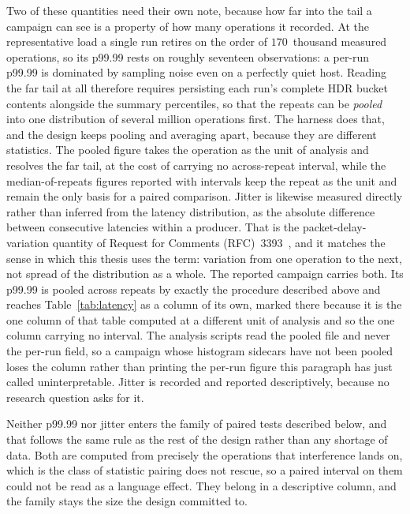 \documentclass[english,oneside,a4paper,censored,csm,software-track-2020]{HYthesisML}
\begin{document}
\begin{appendices}
Two of these quantities need their own note, because how far into the tail a campaign can see
is a property of how many operations it recorded. At the representative load a single run
retires on the order of $170$~thousand measured operations, so its p99.99 rests on roughly
seventeen observations: a per-run p99.99 is dominated by sampling noise even on a perfectly
quiet host. Reading the far tail at all therefore requires persisting each run's complete HDR
bucket contents alongside the summary percentiles, so that the repeats can be \emph{pooled} into
one distribution of several million operations first. The harness does that, and the design keeps
pooling and averaging apart, because they are different statistics. The pooled figure takes the
operation as the unit of analysis and resolves the far tail, at the cost of carrying no
across-repeat interval, while the median-of-repeats figures reported with intervals keep the
repeat as the unit and remain the only basis for a paired comparison. Jitter is likewise
measured directly rather than inferred from the latency distribution, as the absolute difference
between consecutive latencies within a producer. That is the packet-delay-variation quantity of
Request for Comments (RFC)~3393~\cite{rfc3393}, and it matches the sense in which this thesis
uses the term: variation
from one operation to the next, not spread of the distribution as a whole. The reported campaign
carries both. Its p99.99 is pooled across repeats by exactly the procedure described above and
reaches Table~\ref{tab:latency} as a column of its own, marked there because it is the one column of
that table computed at a different unit of analysis and so the one column carrying no interval. The
analysis scripts read the pooled file and never the per-run field, so a campaign whose histogram
sidecars have not been pooled loses the column rather than printing the per-run figure this paragraph
has just called uninterpretable. Jitter is recorded and reported descriptively, because no research
question asks for it.

Neither p99.99 nor jitter enters the family of paired tests described below, and that follows the
same rule as the rest of the design rather than any shortage of data. Both are computed from
precisely the operations that interference lands on, which is the class of statistic pairing does
not rescue, so a paired interval on them could not be read as a language effect. They belong in a
descriptive column, and the family stays the size the design committed to.


\end{appendices}
\end{document}

